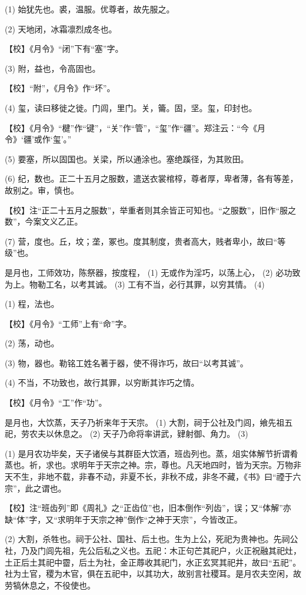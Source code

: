 \documentclass[12pt,UTF8]{ctexbook}
\begin{document}
(1) 始犹先也。裘，温服。优尊者，故先服之。

(2) 天地闭，冰霜凛烈成冬也。

【校】《月令》“闭”下有“塞”字。

(3) 附，益也，令高固也。

【校】“附”，《月令》作“坏”。

(4) 玺，读曰移徙之徙。门闾，里门。关，籥。固，坚。玺，印封也。

【校】《月令》“楗”作“键”，“关”作“管”，“玺”作“疆”。郑注云：“今《月令》‘疆’或作‘玺’。”

(5) 要塞，所以固国也。关梁，所以通涂也。塞绝蹊径，为其败田。

(6) 纪，数也。正二十五月之服数，遣送衣裳棺椁，尊者厚，卑者薄，各有等差，故别之。审，慎也。

【校】注“正二十五月之服数”，举重者则其余皆正可知也。“之服数”，旧作“服之数”，今案文义乙正。

(7) 营，度也。丘，坟；垄，冢也。度其制度，贵者高大，贱者卑小，故曰“等级”也。

是月也，工师效功，陈祭器，按度程， (1) 无或作为淫巧，以荡上心， (2) 必功致为上。物勒工名，以考其诚。 (3) 工有不当，必行其罪，以穷其情。 (4)

(1) 程，法也。

【校】《月令》“工师”上有“命”字。

(2) 荡，动也。

(3) 物，器也。勒铭工姓名著于器，使不得诈巧，故曰“以考其诚”。

(4) 不当，不功致也，故行其罪，以穷断其诈巧之情。

【校】《月令》“工”作“功”。

是月也，大饮蒸，天子乃祈来年于天宗。 (1) 大割，祠于公社及门闾，飨先祖五祀，劳农夫以休息之。 (2) 天子乃命将率讲武，肄射御、角力。 (3)

(1) 是月农功毕矣，天子诸侯与其群臣大饮酒，班齿列也。蒸，俎实体解节折谓肴蒸也。祈，求也。求明年于天宗之神。宗，尊也。凡天地四时，皆为天宗。万物非天不生，非地不载，非春不动，非夏不长，非秋不成，非冬不藏，《书》曰“禋于六宗”，此之谓也。

【校】注“班齿列”即《周礼》之“正齿位”也，旧本倒作“列齿”，误；又“体解”亦缺“体”字，又“求明年于天宗之神”倒作“之神于天宗”，今皆改正。

(2) 大割，杀牲也。祠于公社、国社、后土也。生为上公，死祀为贵神也。先祠公社，乃及门闾先祖，先公后私之义也。五祀：木正句芒其祀户，火正祝融其祀灶，土正后土其祀中霤，后土为社，金正蓐收其祀门，水正玄冥其祀井，故曰“五祀”。社为土官，稷为木官，俱在五祀中，以其功大，故别言社稷耳。是月农夫空闲，故劳犒休息之，不役使也。
\end{document}

